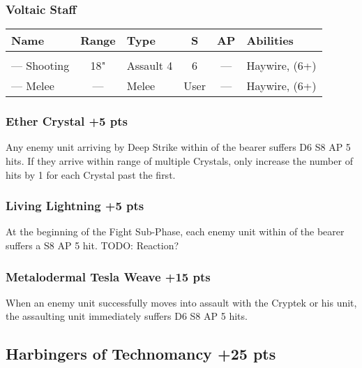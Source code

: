 \subsubsection{Voltaic Staff}
\label{Voltaic Staff}
\noindent
\begin{NiceTabular}{L{115 pt} c C{40pt} *{2}{c} >{\raggedright\arraybackslash}p{240pt}}
	Name & Range & Type & S & AP & Abilities \\
	\hline
	 &  &  &  &  & \\
	— Shooting & 18" & Assault 4 & 6 & — & Haywire,  (6+) \\
	— Melee & — & Melee & User & — & Haywire,  (6+) \\
\end{NiceTabular}

\subsubsection[Ether Crystal ]{Ether Crystal  \hrulefill +5 pts}

Any enemy unit arriving by Deep Strike within  of the bearer suffers D6 S8 AP 5 hits. If they arrive within range of multiple Crystals, only increase the number of hits by 1 for each Crystal past the first.

\subsubsection[Living Lightning ]{Living Lightning  \hrulefill +5 pts}

At the beginning of the Fight Sub-Phase, each enemy unit within  of the bearer suffers a S8 AP 5 hit. TODO: Reaction?

\subsubsection[Metalodermal Tesla Weave ]{Metalodermal Tesla Weave  \hrulefill +15 pts}

When an enemy unit successfully moves into assault with the Cryptek or his unit, the assaulting unit immediately suffers D6 S8 AP 5 hits.




\subsection[Harbingers of Technomancy ]{Harbingers of Technomancy  \hrulefill +25 pts}

